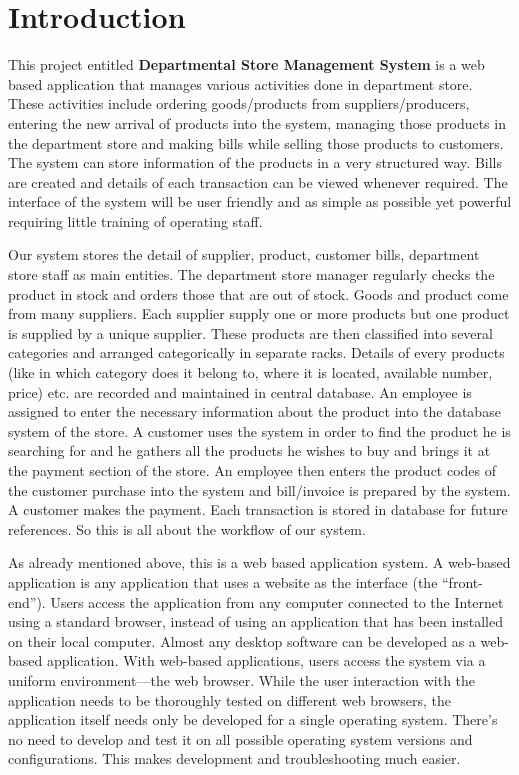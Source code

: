 \section{Introduction}


This project entitled {\bf Departmental Store Management System} is a web based
application that manages various activities done in department store.
These activities include ordering goods/products from suppliers/producers,
entering the new arrival of products into the system, managing those products
in the department store and making bills while selling those products to customers.
The system can store information of the products in a very structured way.
Bills are created and details of each transaction can be viewed whenever required.
The interface of the system will be user friendly and as simple as possible
yet powerful requiring little training of operating staff.

Our system stores the detail of supplier, product, customer bills, department
store staff as main entities. The department store manager regularly checks the 
product in stock and orders those that are out of stock. Goods and product come 
from many suppliers. Each supplier supply one or more products but one product 
is supplied by a unique supplier. These products are then classified into several 
categories and arranged categorically in separate racks. Details of every products 
(like in which category does it belong to, where it is located, available number, 
price) etc. are recorded and maintained in central database. An employee is assigned 
to enter the necessary information about the product into the database system of 
the store. A customer uses the system in order to find the product he is searching 
for and he gathers all the products he wishes to buy and brings it at the payment 
section of the store. An employee then enters the product codes of the customer 
purchase into the system and bill/invoice is prepared by the system. A customer 
makes the payment. Each transaction is stored in database for future references. 
So this is all about the workflow of our system.

As already mentioned above, this is a web based application system. A web-based 
application is any application that uses a website as the interface
(the ``front-end''). Users access the application from any computer connected
to the Internet using a standard browser, instead of using an application 
that has been installed on their local computer. Almost any desktop software 
can be developed as a web-based application. With web-based applications, 
users access the system via a uniform environment---the web browser. While the 
user interaction with the application needs to be thoroughly tested on different 
web browsers, the application itself needs only be developed for a single
operating system. There's no need to develop and test it on all possible 
operating system versions and configurations. This makes development and 
troubleshooting much easier.
